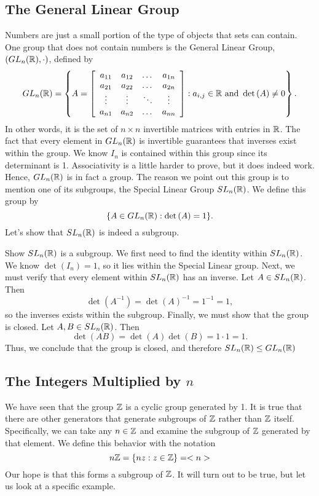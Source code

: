 \subsection*{The General Linear Group}
Numbers are just a small portion of the type of objects that sets can contain. One group that does not contain numbers is the General Linear Group, $(GL_{n}(\mathbb{R}),\cdot)$, defined by
\[
	GL_{n}(\mathbb{R}) = \left\{
	A=
	\left[
	\begin{array}{c c c c}
		a_{11} & a_{12} & \dots  & a_{1n} \\
		a_{21} & a_{22} & \dots  & a_{2n} \\
		\vdots & \vdots & \ddots & \vdots \\
		a_{n1} & a_{n2} & \dots  & a_{nn}
	\end{array}
	\right]
	:
	a_{i,j}\in\mathbb{R}\text{ and } \det{(A)}\neq 0
	\right\}.
\]
In other words, it is the set of $n\times n$ invertible matrices with entries in $\mathbb{R}$. The fact that every element in $GL_{n}(\mathbb{R})$ is invertible guarantees that inverses exist within the group. We know $I_{n}$ is contained within this group since its determinant is 1. Associativity is a little harder to prove, but it does indeed work. Hence, $GL_{n}(\mathbb{R})$ is in fact a group. The reason we point out this group is to mention one of its subgroups, the Special Linear Group $SL_{n}(\mathbb{R})$. We define this group by
\[
	\{A\in GL_{n}(\mathbb{R}) : \det{(A)}=1\}.
\]
Let's show that $SL_{n}(\mathbb{R})$ is indeed a subgroup.

\begin{example}{Show $SL_{n}(\mathbb{R})$ is a subgroup.}
	We first need to find the identity within $SL_{n}(\mathbb{R})$. We know $\det{(I_{n})}=1$, so it lies within the Special Linear group. Next, we must verify that every element within $SL_{n}(\mathbb{R})$ has an inverse. Let $A\in SL_{n}(\mathbb{R})$. Then
	\[
		\det{(A^{-1})}=\det{(A)}^{-1}=1^{-1}=1,
	\]
	so the inverses exists within the subgroup. Finally, we must show that the group is closed. Let $A,B\in
	SL_{n}(\mathbb{R})$. Then
	\[
		\det{(AB)}=\det{(A)}\det{(B)}=1\cdot 1=1.
	\]
	Thus, we conclude that the group is closed, and therefore $SL_{n}(\mathbb{R})\leq GL_{n}(\mathbb{R})$
\end{example}

\subsection*{The Integers Multiplied by $n$}
We have seen that the group $\mathbb{Z}$ is a cyclic group generated by 1. It is true that there are other generators that generate subgroups of $\mathbb{Z}$ rather than $\mathbb{Z}$ itself. Specifically, we can take any $n\in\mathbb{Z}$ and examine the subgroup of $\mathbb{Z}$ generated by that element. We define this behavior with the notation
\[
	n\mathbb{Z}=\{nz:z\in\mathbb{Z}\} = <n>
\]
Our hope is that this forms a subgroup of $\mathbb{Z}$. It will turn out to be true, but let us look at a specific example.

